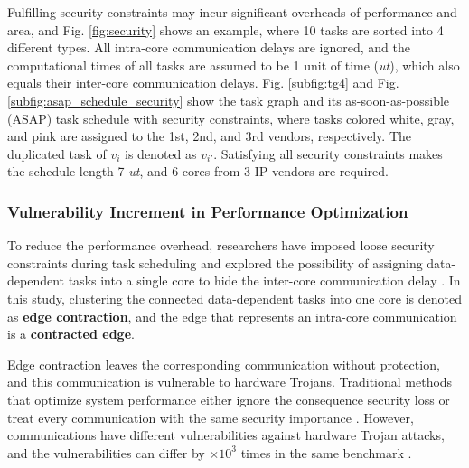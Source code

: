 \documentclass[10pt,journal, compsoc]{IEEEtran}
\begin{document}
Fulfilling security constraints may incur significant overheads of performance and area, and Fig. \ref{fig:security} shows an example, where 10 tasks are sorted into 4 different types. All intra-core communication delays are ignored, and the computational times of all tasks are assumed to be 1 unit of time (\textit{ut}), which also equals their inter-core communication delays. Fig. \ref{subfig:tg4} and Fig. \ref{subfig:asap_schedule_security} show the task graph and its as-soon-as-possible (ASAP) task schedule with security constraints, where tasks colored white, gray, and pink are assigned to the 1st, 2nd, and 3rd vendors, respectively. The duplicated task of $v_i$ is denoted as $v_{i'}$. Satisfying all security constraints makes the schedule length 7 \textit{ut}, and 6 cores from 3 IP vendors are required.



\subsubsection{Vulnerability Increment in Performance Optimization}

To reduce the performance overhead, researchers have imposed loose security constraints during task scheduling and explored the possibility of assigning data-dependent tasks into a single core to hide the inter-core communication delay \cite{article:CL, article:NW, conference:NW}. In this study, clustering the connected data-dependent tasks into one core is denoted as \textbf{edge contraction}, and the edge that represents an intra-core communication is a \textbf{contracted edge}.

Edge contraction leaves the corresponding communication without protection, and this communication is vulnerable to hardware Trojans. Traditional methods that optimize system performance either ignore the consequence security loss \cite{article:CL} or treat every communication with the same security importance \cite{article:NW, conference:NW}. However, communications have different vulnerabilities against hardware Trojan attacks, and the vulnerabilities can differ by $\times10^3$ times in the same benchmark \cite{conference:HS}.
\end{document}
